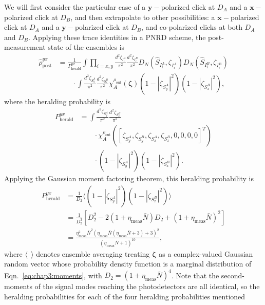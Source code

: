 \documentclass[aps,twocolumn,secnumarabic,amsmath,amssymb,pra,groupedaddress,
showpacs, showkeys]{revtex4-1}
\newcommand{\pna}[1]{\left(#1\right)}
\newcommand{\pnb}[1]{\left[#1\right]}
\begin{document}
We will first consider the particular case of a $\mathbf{y}-$polarized click at
$D_A$ and a $\mathbf{x}-$polarized click at $D_B$, and then extrapolate to
other possibilities: a $\mathbf{x}-$polarized click at $D_A$ and a
$\mathbf{y}-$polarized click at $D_B$, and co-polarized clicks at both $D_A$
and $D_B$. Applying these trace identities in a PNRD scheme, the
post-measurement state of the ensembles is
\begin{align}
\hat{\rho}_{\textrm{post}}^{yx}& =
\frac{1}{P_{\textrm{herald}}^{yx}}\int 
\prod_{i=x,y}
\frac{d^2 \zeta_{I_i^A}}{\pi^2} 
\frac{d^2 \zeta_{I_i^B}}{\pi^2} 
D_N\pna{\hat{S}_{I_i^A},\zeta_{I_i^A}} 
D_N\pna{\hat{S}_{I_i^B},\zeta_{I_i^B}}  \nonumber \\
& \qquad \cdot \int 
\frac{d^2 \zeta_{S_y^A}}{\pi^2} 
\frac{d^2 \zeta_{S_x^B}}{\pi^2}
\chi_A^{\rho_{\textrm{out}}}\pna{\bm{\zeta}} 
\pna{1-|\zeta_{S_y^A}|^2}\pna{1-|\zeta_{S_x^B}|^2},
\end{align}
where the heralding probability is
\begin{align}
P_{\textrm{herald}}^{yx} & =
\int 
\frac{d^2 \zeta_{S_y^A}}{\pi^2} 
\frac{d^2 \zeta_{S_x^B}}{\pi^2} \nonumber \\ 
& \qquad \cdot
\chi_A^{\rho_{\textrm{out}}}\pna{\pnb{\zeta_{S_y^A},\zeta_{S_y^B},\zeta_{S_x^A},\zeta_{S_x^B},0,0,0,0}^T}
\nonumber \\ 
& \qquad \cdot \pna{1-|\zeta_{S_y^A}|^2}\pna{1-|\zeta_{S_x^B}|^2}.
\end{align}
Applying the Gaussian moment factoring theorem, this heralding probability is
\begin{align}
P_{\textrm{herald}}^{yx}&=\frac{1}{D_2}\langle \pna{1-|\zeta_{S_y^A}|^2}\pna{1-|\zeta_{S_x^B}|^2} \rangle \nonumber \\
	&=\frac{1}{D_2^3}\pnb{D_2^2-2\pna{1+\eta_{\textrm{meas}}\bar{N}}D_2+\pna{1+\eta_{\textrm{meas}}\bar{N}}^2} \nonumber \\
	& = \frac{\eta^2_{\textrm{meas}} \bar{N}^2 (\eta_{\textrm{meas}}  \bar{N} (\eta_{\textrm{meas}}  \bar{N}+3)+3)^2}{(\eta_{\textrm{meas}}  \bar{N}+1)^{10}},
\end{align}
where $\langle~~\rangle$ denotes ensemble averaging treating $\bm{\zeta}$ as a
complex-valued Gaussian random vector whose probability density function is a
marginal distribution of Eqn.~\ref{eq:chap3:moments}, with
$D_2=\pna{1+\eta_{\textrm{meas}}\bar{N}}^4$. Note that the second-moments of
the signal modes reaching the photodetectors are all identical, so the
heralding probabilities for each of the four heralding probabilities mentioned
\end{document}
